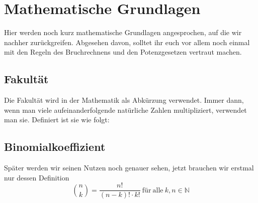 \section{Mathematische Grundlagen}
	Hier werden noch kurz mathematische Grundlagen angesprochen, auf die wir
	nachher zurückgreifen. Abgesehen davon, solltet ihr euch vor allem noch einmal
	mit den Regeln des Bruchrechnens und den Potenzgesetzen vertraut machen.

	\subsection{Fakultät}
		Die Fakultät wird in der Mathematik als Abkürzung verwendet. Immer dann, wenn
		man viele aufeinanderfolgende natürliche Zahlen multipliziert, verwendet man
		sie. Definiert ist sie wie folgt:
		\formel{\[n!=1\cdot 2\cdot \ldots \cdot (n-1)\cdot n\ \&\ 0!=1\]}

	\subsection{Binomialkoeffizient}
		Später werden wir seinen Nutzen noch genauer sehen, jetzt brauchen wir erstmal
		nur dessen Definition
		\[\binom{n}{k}=\frac{n!}{(n-k)!\cdot k!}\mathrm{\ für\ alle\ }k,n\in
		\mathbb{N}\]
